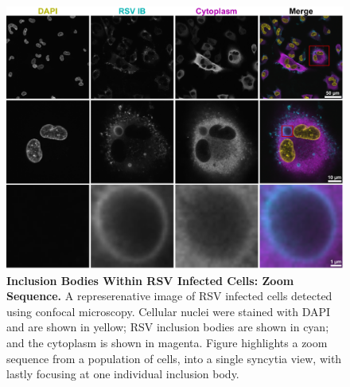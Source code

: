 \begin{figure}
    \centering
    \includegraphics[width=1\linewidth]{08. Chapter 3/Figs/01. Localisation introduction/01. IB-zooms.pdf}
    \caption[Inclusion Bodies Within RSV Infected Cells: Zoom Sequence.]{\textbf{Inclusion Bodies Within RSV Infected Cells: Zoom Sequence.} A represerenative image of RSV infected cells detected using confocal microscopy. Cellular nuclei were stained with DAPI and are shown in yellow; RSV inclusion bodies are shown in cyan; and the cytoplasm is shown in magenta. Figure highlights a zoom sequence from a population of cells, into a single syncytia view, with lastly focusing at one individual inclusion body.}
    \label{fig:Inclusion Bodies Within RSV Infected Cells: Zoom Sequence}
\end{figure}

